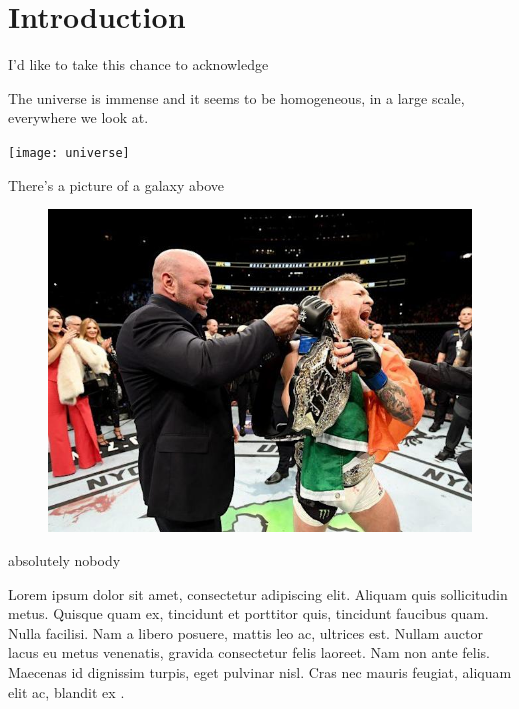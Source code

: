 \chapter{Introduction}

I'd like to take this chance to acknowledge


\graphicspath{ {./images/} }

The universe is immense and it seems to be homogeneous, 
in a large scale, everywhere we look at.

\texttt{[image: universe]}

There's a picture of a galaxy above



\begin{figure}[hbt]
	\centering
	\includegraphics{templates/me.jpg}
\end{figure}


absolutely nobody

Lorem ipsum dolor sit amet, consectetur adipiscing elit. Aliquam quis sollicitudin metus. Quisque quam ex, tincidunt et porttitor quis, tincidunt faucibus quam. Nulla facilisi. Nam a libero posuere, mattis leo ac, ultrices est. Nullam auctor lacus eu metus venenatis, gravida consectetur felis laoreet. Nam non ante felis. Maecenas id dignissim turpis, eget pulvinar nisl. Cras nec mauris feugiat, aliquam elit ac, blandit ex \cite{article-full}.

